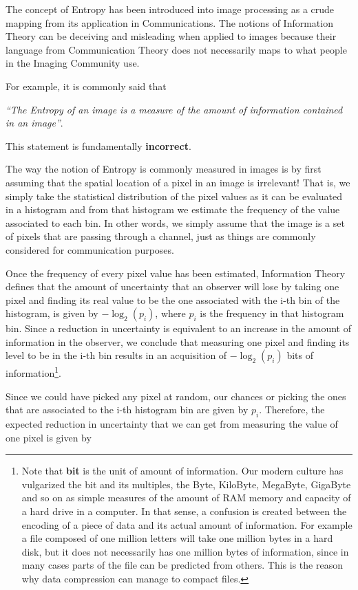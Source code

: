 The concept of Entropy has been introduced into image processing as a crude
mapping from its application in Communications. The notions of Information
Theory can be deceiving and misleading when applied to images because their
language from Communication Theory does not necessarily maps to what people in
the Imaging Community use.

For example, it is commonly said that

\emph{``The Entropy of an image is a measure of the amount of information
contained in an image''}. 

This statement is fundamentally \textbf{incorrect}. 

The way the notion of Entropy is commonly measured in images is by first
assuming that the spatial location of a pixel in an image is irrelevant!  That
is, we simply take the statistical distribution of the pixel values as it can
be evaluated in a histogram and from that histogram we estimate the frequency
of the value associated to each bin. In other words, we simply assume that the
image is a set of pixels that are passing through a channel, just as things are
commonly considered for communication purposes.

Once the frequency of every pixel value has been estimated, Information Theory
defines that the amount of uncertainty that an observer will lose by taking one
pixel and finding its real value to be the one associated with the i-th bin of the
histogram, is given by $-\log_2{(p_i)}$, where $p_i$ is the frequency in that
histogram bin. Since a reduction in uncertainty is equivalent to an increase in
the amount of information in the observer, we conclude that measuring one pixel
and finding its level to be in the i-th bin results in an acquisition of
$-\log_2{(p_i)}$ bits of information\footnote{Note that \textbf{bit} is the unit of
amount of information. Our modern culture has vulgarized the bit and its
multiples, the Byte, KiloByte, MegaByte, GigaByte and so on as simple measures
of the amount of RAM memory and capacity of a hard drive in a computer. In that
sense, a confusion is created between the encoding of a piece of data and its
actual amount of information. For example a file composed of one million
letters will take one million bytes in a hard disk, but it does not necessarily
has one million bytes of information, since in many cases parts of the file can
be predicted from others. This is the reason why data compression can manage to
compact files.}.

Since we could have picked any pixel at random, our chances or picking the ones
that are associated to the i-th histogram bin are given by $p_i$. Therefore,
the expected reduction in uncertainty that we can get from measuring the value
of one pixel is given by

